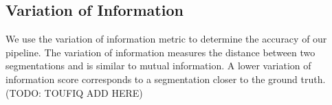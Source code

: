 \subsection{Variation of Information}

We use the variation of information metric to determine the accuracy of our pipeline. The variation of information measures the distance between two segmentations and is similar to mutual information. A lower variation of information score corresponds to a segmentation closer to the ground truth. (TODO: TOUFIQ ADD HERE)












